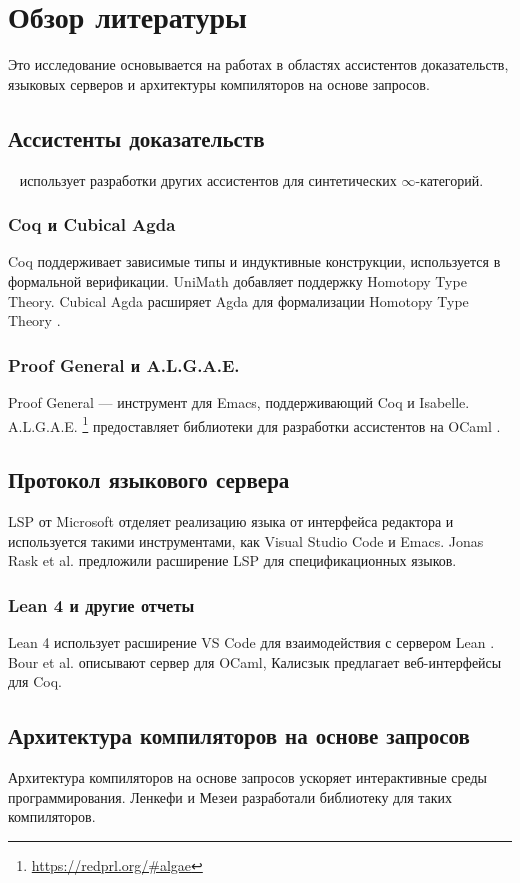 \chapter{Обзор литературы}
\label{chap:lr}

Это исследование основывается на работах в областях ассистентов доказательств, языковых серверов и архитектуры компиляторов на основе запросов.

\section{Ассистенты доказательств}

\Rzk{}~\cite{kudasov2023experimental} использует разработки других ассистентов для синтетических $\infty$-категорий.

\subsection{Coq и Cubical Agda}

Coq \cite{huet1997coq} поддерживает зависимые типы и индуктивные конструкции, используется в формальной верификации. UniMath \cite{DanielGrayson2024, MacPherson2019} добавляет поддержку Homotopy Type Theory. Cubical Agda \cite{VEZZOSI2021} расширяет Agda для формализации Homotopy Type Theory \cite{Cohen2016}.

\subsection{Proof General и A.L.G.A.E.}

Proof General \cite{Aspinall2000} — инструмент для Emacs, поддерживающий Coq и Isabelle. A.L.G.A.E. \footnote{\url{https://redprl.org/\#algae}} предоставляет библиотеки для разработки ассистентов на OCaml \cite{Kovacs2021}.

\section{Протокол языкового сервера}

LSP от Microsoft отделяет реализацию языка от интерфейса редактора \cite{Buender2019} и используется такими инструментами, как Visual Studio Code и Emacs. Jonas Rask et al. \cite{JonasKjaerRask2021} предложили расширение LSP для спецификационных языков.

\subsection{Lean 4 и другие отчеты}

Lean 4 использует расширение VS Code для взаимодействия с сервером Lean \cite{Nawrocki2023}. Bour et al. \cite{Bour2018} описывают сервер для OCaml, Калисзык \cite{Kaliszyk2007} предлагает веб-интерфейсы для Coq.

\section{Архитектура компиляторов на основе запросов}

Архитектура компиляторов на основе запросов \cite{ollef-rock} ускоряет интерактивные среды программирования. Ленкефи и Мезеи \cite{icsoft22} разработали библиотеку для таких компиляторов.
